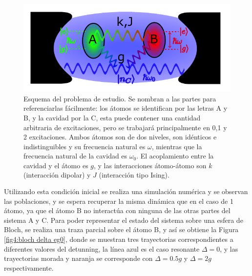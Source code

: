 \begin{figure}[h]
    \centering
    \includegraphics[width=\textwidth]{figuras/ch4/esquema.pdf}
    \caption{Esquema del problema de estudio. Se nombran a las partes para referenciarlas fácilmente: los átomos se identifican por las letras A y B, y la cavidad por la C, esta puede contener una cantidad arbitraria de excitaciones, pero se trabajará principalmente en 0,1 y 2 excitaciones. Ambos átomos son de dos niveles, son idénticos e indistinguibles y su frecuencia natural es $\omega$, mientras que la frecuencia natural de la cavidad es $\omega_0$. El acoplamiento entre la cavidad y el átomo es $g$, y las interacciones átomo-átomo son $k$ (interacción dipolar) y $J$ (interacción tipo Ising).}
    \label{fig4:diagrama esquematico}
\end{figure}
Utilizando esta condición inicial se realiza una simulación numérica y se observan las poblaciones, y se espera recuperar la misma dinámica que en el caso de 1 átomo, ya que el átomo B no interactúa con ninguna de las otras partes del sistema A y C. Para poder representar el estado del sistema sobre una esfera de Bloch, se realiza una traza parcial sobre el átomo B, y así se obtiene la Figura \ref{fig4:bloch delta eg0}, donde se muestran tres trayectorias correspondientes a diferentes valores del detunning, la línea azul es el caso resonante $\Delta=0$, y las trayectorias morada y naranja se corresponde con $\Delta=0.5g$ y $\Delta=2g$ respectivamente.

